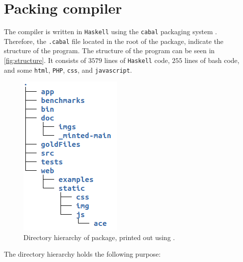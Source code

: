 \section{Packing compiler }
The \lan compiler is written in \texttt{Haskell} using the \texttt{cabal} packaging system
\cite{cabal}. Therefore, the \texttt{.cabal} file located in the root of the package, indicate
the structure of the program. The structure of the program can be seen in
\autoref{fig:structure}. It consists of $3579$ lines of \texttt{Haskell} code, $255$ lines of
bash code, and some \texttt{html}, \texttt{PHP}, \texttt{css}, and \texttt{javascript}.

\begin{figure}[H]
    \centering
    \includegraphics[scale=0.7]{imgs/directory-structure.png}
    \caption{Directory hierarchy of \lan package, printed out using .}
    \label{fig:structure}
\end{figure}
\noindent
The directory hierarchy holds the following purpose:

